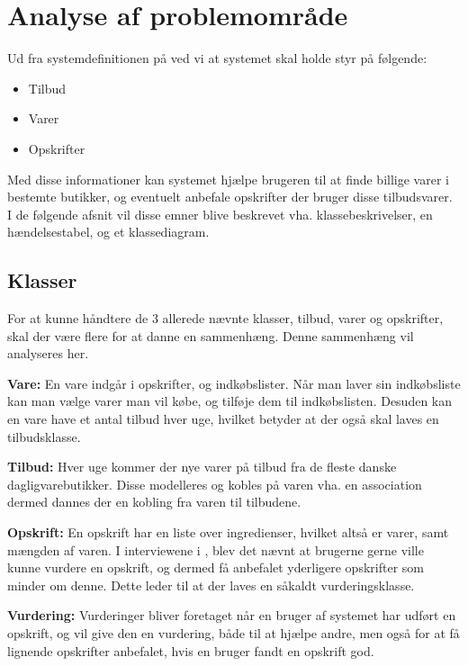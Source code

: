 \section{Analyse af problemområde}

Ud fra systemdefinitionen på  ved vi at systemet skal holde styr på følgende:

\begin{itemize}
	\item Tilbud
	\item Varer
	\item Opskrifter
\end{itemize}

Med disse informationer kan systemet hjælpe brugeren til at finde billige varer i bestemte butikker, og eventuelt anbefale opskrifter der bruger disse tilbudsvarer.
I de følgende afsnit vil disse emner blive beskrevet vha. klassebeskrivelser, en hændelsestabel, og et klassediagram.

\subsection{Klasser}
For at kunne håndtere de 3 allerede nævnte klasser, tilbud, varer og opskrifter, skal der være flere for at danne en sammenhæng.
Denne sammenhæng vil analyseres her.

\textbf{Vare:}
En vare indgår i opskrifter, og indkøbslister.
Når man laver sin indkøbsliste kan man vælge varer man vil købe, og tilføje dem til indkøbslisten.
Desuden kan en vare have et antal tilbud hver uge, hvilket betyder at der også skal laves en tilbudsklasse.

\textbf{Tilbud:}
Hver uge kommer der nye varer på tilbud fra de fleste danske dagligvarebutikker.
Disse modelleres og kobles på varen vha. en association dermed dannes der en kobling fra varen til tilbudene.

\textbf{Opskrift:}
En opskrift har en liste over ingredienser, hvilket altså er varer, samt mængden af varen.
I interviewene i , blev det nævnt at brugerne gerne ville kunne vurdere en opskrift, og dermed få anbefalet yderligere opskrifter som minder om denne.
Dette leder til at der laves en såkaldt vurderingsklasse.

\textbf{Vurdering:}
Vurderinger bliver foretaget når en bruger af systemet har udført en opskrift, og vil give den en vurdering, både til at hjælpe andre, men også for at få lignende opskrifter anbefalet, hvis en bruger fandt en opskrift god.

